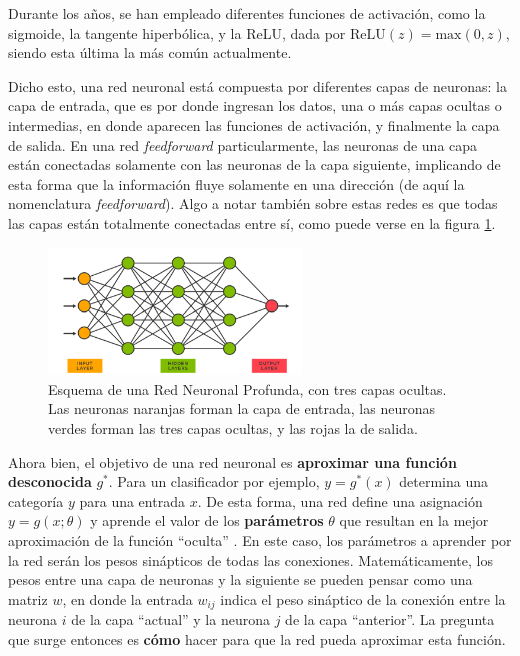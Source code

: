 \documentclass[../../main.tex]{subfiles}
\begin{document}
Durante los años, se han empleado diferentes funciones de activación, como la sigmoide, la tangente hiperbólica, y la ReLU, dada por \(\text{ReLU}(z)=\text{max}(0, z)\), siendo esta última la más común actualmente.

Dicho esto, una red neuronal está compuesta por diferentes capas de neuronas: la capa de entrada, que es por donde ingresan los datos, una o más capas ocultas o intermedias, en donde aparecen las funciones de activación, y finalmente la capa de salida. En una red \textit{feedforward} particularmente, las neuronas de una capa están conectadas solamente con las neuronas de la capa siguiente, implicando de esta forma que la información fluye solamente en una dirección (de aquí la nomenclatura \textit{feedforward}). Algo a notar también sobre estas redes es que todas las capas están totalmente conectadas entre sí, como puede verse en la figura \ref{fig:neural-net}.

\begin{figure}[h!]
    \centering
    \includegraphics[width=0.6\textwidth]{figs/feedforward.png}
    \caption{Esquema de una Red Neuronal Profunda, con tres capas ocultas. Las neuronas naranjas forman la capa de entrada, las neuronas verdes forman las tres capas ocultas, y las rojas la de salida.}
    \label{fig:neural-net}
\end{figure}

Ahora bien, el objetivo de una red neuronal es \textbf{aproximar una función desconocida} \(g^*\). Para un clasificador por ejemplo, \(y=g^*(x)\) determina una categoría \(y\) para una entrada \(x\). De esta forma, una red define una asignación \(y=g(x; \theta)\) y aprende el valor de los \textbf{parámetros} \(\theta\) que resultan en la mejor aproximación de la función ``oculta'' \cite{deep-learning}. En este caso, los parámetros a aprender por la red serán los pesos sinápticos de todas las conexiones. Matemáticamente, los pesos entre una capa de neuronas y la siguiente se pueden pensar como una matriz \(w\), en donde la entrada \(w_{ij}\) indica el peso sináptico de la conexión entre la neurona \(i\) de la capa ``actual'' y la neurona \(j\) de la capa ``anterior''. La pregunta que surge entonces es \textbf{cómo} hacer para que la red pueda aproximar esta función.
\end{document}
